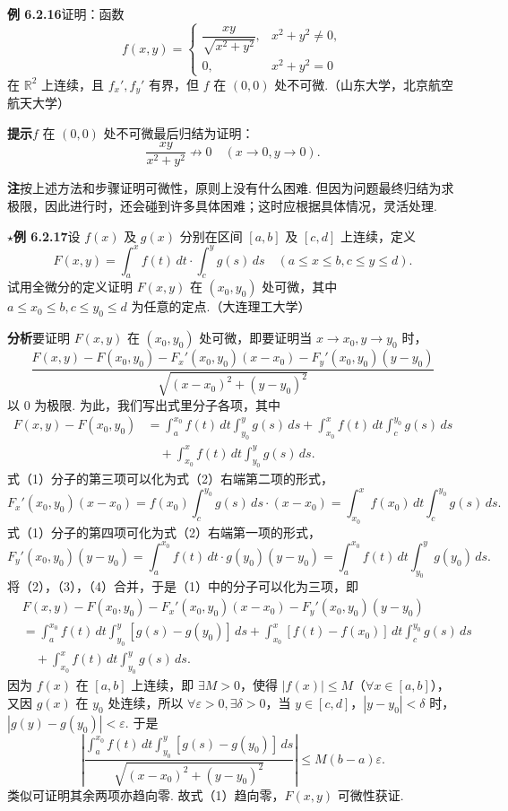 \documentclass[UTF8, 12pt, fontset=fandol, oneside]{ctexart}
\begin{document}
\noindent\textbf{例 6.2.16}\quad 证明：函数
\[
  f(x,y)=
  \begin{cases}
  \dfrac{xy}{\sqrt{x^2+y^2}}, & x^2+y^2\ne0,\\
  0, & x^2+y^2=0
  \end{cases}
\]
在 $\mathbb{R}^2$ 上连续，且 $f_x',f_y'$ 有界，但 $f$ 在 $(0,0)$ 处不可微.（山东大学，北京航空航天大学）

\noindent\textbf{提示}\quad $f$ 在 $(0,0)$ 处不可微最后归结为证明：
\[
  \frac{xy}{x^2+y^2}\not\to0\quad(x\to0,y\to0).
\]

\noindent\textbf{注}\quad 按上述方法和步骤证明可微性，原则上没有什么困难. 但因为问题最终归结为求极限，因此进行时，还会碰到许多具体困难；这时应根据具体情况，灵活处理.

\noindent\textbf{\ensuremath{\star}例 6.2.17}\quad 设 $f(x)$ 及 $g(x)$ 分别在区间 $[a,b]$ 及 $[c,d]$ 上连续，定义
\[
  F(x,y)=\int_a^x f(t)\,dt\cdot\int_c^y g(s)\,ds\quad(a\le x\le b,c\le y\le d).
\]
试用全微分的定义证明 $F(x,y)$ 在 $(x_0,y_0)$ 处可微，其中 $a\le x_0\le b,c\le y_0\le d$ 为任意的定点.（大连理工大学）

\noindent\textbf{分析}\quad 要证明 $F(x,y)$ 在 $(x_0,y_0)$ 处可微，即要证明当 $x\to x_0,y\to y_0$ 时，
\[
  \frac{F(x,y)-F(x_0,y_0)-F_x'(x_0,y_0)(x-x_0)-F_y'(x_0,y_0)(y-y_0)}
  {\sqrt{(x-x_0)^2+(y-y_0)^2}}
\]
以 $0$ 为极限. 为此，我们写出式里分子各项，其中
\begin{equation}
\begin{aligned}
F(x,y)-F(x_0,y_0)
&=\int_a^{x_0}f(t)\,dt\int_{y_0}^y g(s)\,ds
+\int_{x_0}^x f(t)\,dt\int_c^{y_0}g(s)\,ds\\
&\quad+\int_{x_0}^x f(t)\,dt\int_{y_0}^y g(s)\,ds.
\end{aligned}
\tag{2}
\end{equation}
式（1）分子的第三项可以化为式（2）右端第二项的形式，
\[
  F_x'(x_0,y_0)(x-x_0)
  =f(x_0)\int_c^{y_0}g(s)\,ds\cdot(x-x_0)
  =\int_{x_0}^x f(x_0)\,dt\int_c^{y_0}g(s)\,ds. \tag{3}
\]
式（1）分子的第四项可化为式（2）右端第一项的形式，
\[
  F_y'(x_0,y_0)(y-y_0)
  =\int_a^{x_0}f(t)\,dt\cdot g(y_0)(y-y_0)
  =\int_a^{x_0}f(t)\,dt\int_{y_0}^y g(y_0)\,ds. \tag{4}
\]
将（2），（3），（4）合并，于是（1）中的分子可以化为三项，即
\begin{equation}
\begin{aligned}
&F(x,y)-F(x_0,y_0)-F_x'(x_0,y_0)(x-x_0)-F_y'(x_0,y_0)(y-y_0)\\
&=\int_a^{x_0}f(t)\,dt\int_{y_0}^y[g(s)-g(y_0)]\,ds
+\int_{x_0}^x[f(t)-f(x_0)]\,dt\int_c^{y_0}g(s)\,ds\\
&\quad+\int_{x_0}^x f(t)\,dt\int_{y_0}^y g(s)\,ds.
\end{aligned}
\tag{5}
\end{equation}
因为 $f(x)$ 在 $[a,b]$ 上连续，即 $\exists M>0$，使得 $|f(x)|\le M$（$\forall x\in[a,b]$），又因 $g(x)$ 在 $y_0$ 处连续，所以 $\forall\varepsilon>0,\exists\delta>0$，当 $y\in[c,d]$，$|y-y_0|<\delta$ 时，$|g(y)-g(y_0)|<\varepsilon$. 于是
\[
\left|
\frac{\int_a^{x_0}f(t)\,dt\int_{y_0}^y[g(s)-g(y_0)]\,ds}
{\sqrt{(x-x_0)^2+(y-y_0)^2}}
\right|
\le M(b-a)\varepsilon.
\]
类似可证明其余两项亦趋向零. 故式（1）趋向零，$F(x,y)$ 可微性获证.
\end{document}

